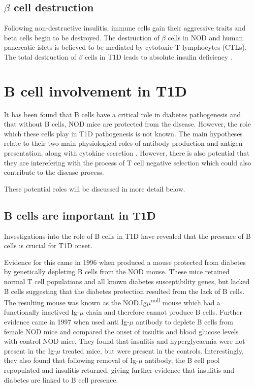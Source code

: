 \subsection{$\beta$ cell destruction}

Following non-destructive insulitis, immune cells gain their aggressive traits and beta cells begin to be destroyed.
The destruction of $\beta$ cells in NOD and human pancreatic islets is believed to be mediated by cytotoxic T lymphocytes (CTLs)\citep{Thomas2000, Brodie2008, Hanafusa2008}.
The total destruction of $\beta$ cells in T1D leads to absolute insulin deficiency \citep{Daneman2006}.


\section{B cell involvement in T1D}
\label{sec:BcellsinT1D}

It has been found that B cells have a critical role in diabetes pathogenesis and that without B cells, NOD mice are protected from the disease.
However, the role which these cells play in T1D pathogenesis is not known.
The main hypotheses relate to their two main physiological roles of antibody production and antigen presentation, along with cytokine secretion \citep{Hinman2014}.
However, there is also potential that they are interefering with the process of T cell negative selection which could also contribute to the disease process.

These potential roles will be discussed in more detail below.

\subsection{B cells are important in T1D}

Investigations into the role of B cells in T1D have revealed that the presence of B cells is crucial for T1D onset.

Evidence for this came in 1996 when \citet{Serreze1996} produced a mouse protected from diabetes by genetically depleting B cells from the NOD mouse.
These mice retained normal T cell populations and all known diabetes susceptibility genes, but lacked B cells suggesting that the diabetes protection resulted from the lack of B cells.
The resulting mouse was known as the NOD.Ig$\mu$\textsuperscript{null} mouse which had a functionally inactived Ig-$\mu$ chain and therefore cannot produce B cells.
Further evidence came in 1997 when \citet{Noorchashm1997} used anti Ig-$\mu$ antibody to deplete B cells from female NOD mice and compared the onset of insultis and blood glucose levels with control NOD mice.
They found that insulitis and hyperglycaemia were not present in the Ig-$\mu$ treated mice, but were present in the controls.
Interestingly, they also found that following removal of Ig-$\mu$ antibody, the B cell pool repopulated and insulitis returned, giving further evidence that insulitis and diabetes are linked to B cell presence.

